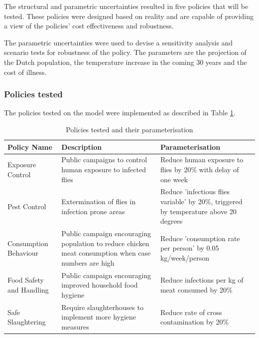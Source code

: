 The structural and parametric uncertainties resulted in five policies that will be tested. These policies were designed based on reality and are capable of providing a view of the policies' cost effectiveness and robustness. 

The parametric uncertainties were used to devise a sensitivity analysis and scenario tests for robustness of the policy. The parameters are the projection of the Dutch population, the temperature increase in the coming 30 years and the cost of illness. 

\subsubsection{Policies tested}

The policies tested on the model were implemented as described in Table \ref{tab:policies}.

\begin{table}[h!]
\centering
\caption{Policies tested and their parameterisation}
\begin{tabular}{ l  p{3.8cm}  p{3.8cm}}
\hline
Policy Name &
   Description &
  Parameterisation \\ \hline
Exposure Control &
  Public campaigns to control human exposure to infected flies &
  Reduce human exposure to flies by 20\% with delay of one week \\
Pest Control &
  Extermination of flies in infection prone areas &
  Reduce 'infectious flies variable' by 20\%, triggered by temperature above 20 degrees \\
Consumption Behaviour &
  Public campaign encouraging population to reduce chicken meat consumption when case numbers are high &
  Reduce 'consumption rate per person' by 0.05 kg/week/person \\
Food Safety and Handling &
  Public campaign encouraging improved household food hygiene &
  Reduce infections per kg of meat consumed by 20\% \\
Safe Slaughtering &
  Require slaughterhouses to implement more hygiene measures &
  Reduce rate of cross contamination by 20\%
\end{tabular}
\label{tab:policies}
\end{table}



